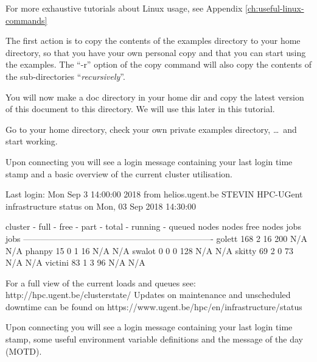 \begin{tip}
For more exhaustive tutorials about Linux usage, see Appendix \ref{ch:useful-linux-commands}
\end{tip}

The first action is to copy the contents of the \hpc examples directory
to your home directory, so that you have your own personal copy and that
you can start using the examples. The ``-r'' option of the copy command
will also copy the contents of the sub-directories ``\emph{recursively}''.

\begin{prompt}
\end{prompt}

\ifgent
You will now make a doc directory in your home dir and copy the latest version of this document to this directory. We will use this later in this tutorial.

\begin{prompt}
\end{prompt}

Go to your home directory, check your own private examples directory, \dots\
and start working.

\begin{prompt}
\end{prompt}

Upon connecting you will see a login message containing your last login
time stamp and a basic overview of the current cluster utilisation.

\begin{prompt}
Last login: Mon Sep  3 14:00:00 2018 from helios.ugent.be
STEVIN HPC-UGent infrastructure status on Mon, 03 Sep 2018 14:30:00

   cluster - full - free -  part - total - running - queued
             nodes  nodes   free   nodes    jobs      jobs
-------------------------------------------------------------------
    golett    168      2     16     200      N/A       N/A
    phanpy     15      0      1      16      N/A       N/A
    swalot      0      0      0     128      N/A       N/A
    skitty     69      2      0      73      N/A       N/A
   victini     83      1      3      96      N/A       N/A

For a full view of the current loads and queues see:
 http://hpc.ugent.be/clusterstate/
Updates on maintenance and unscheduled downtime can be found on
 https://www.ugent.be/hpc/en/infrastructure/status

\end{prompt}
\fi %
%
\ifbrussel
Upon connecting you will see a login message containing your last login
time stamp, some useful environment variable definitions and the message of the
day (MOTD).

